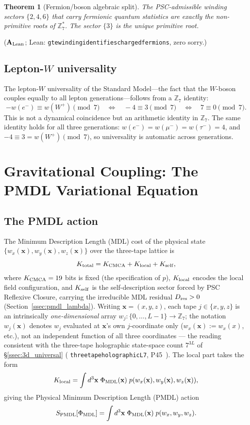 \documentclass[11pt]{article}
\newtheorem{theorem}{Theorem}[section]
\theoremstyle{remark}
\newcommand{\PHIMDL}{\Phi_{\mathrm{MDL}}}
\newcommand{\ZS}{\mathbb{Z}_7}
\newcommand{\ZSstar}{\mathbb{Z}_7^*}
\newcommand{\lean}[1]{%
  \penalty-100
  \begingroup\def\_{\textunderscore\allowbreak}\texttt{#1}\endgroup}
\newcommand{\CatAL}{\ensuremath{\textbf{A}_{\rm Lean}}}
\begin{document}
\begin{theorem}[Fermion/boson algebraic split]
The PSC-admissible winding sectors $\{2,4,6\}$ that carry fermionic quantum
statistics are exactly the non-primitive roots of $\ZSstar$.
The sector $\{3\}$ is the unique primitive root.
\end{theorem}

($\CatAL$; Lean: \lean{gte\_winding\_identifies\_charged\_fermions}, zero sorry.)

\subsection{Lepton-$W$ universality}
\label{ssec:lw_univ}

The lepton-$W$ universality of the Standard Model---the fact that the
$W$-boson couples equally to all lepton generations---follows from a $\ZS$
identity:
\[
  -w(e^-) \equiv w(W^+) \pmod 7 \quad \Leftrightarrow \quad
  -4 \equiv 3 \pmod 7 \quad \Leftrightarrow \quad 7 \equiv 0 \pmod 7.
\]
This is not a dynamical coincidence but an arithmetic identity in $\ZS$.
The same identity holds for all three generations: $w(e^-)=w(\mu^-)=w(\tau^-)=4$,
and $-4\equiv 3=w(W^+)\pmod7$, so universality is automatic across generations.

\section{Gravitational Coupling: The PMDL Variational Equation}
\label{sec:gravity}

\subsection{The PMDL action}
\label{ssec:pmdl_action}

The Minimum Description Length (MDL) cost of the physical state
$\{w_x(\mathbf{x}),w_y(\mathbf{x}),w_z(\mathbf{x})\}$ over the three-tape lattice is
\[
  K_{\rm total} = K_{\rm CMCA} + K_{\rm local} + K_{\rm self},
\]
where $K_{\rm CMCA} = 19$ bits is fixed (the specification of $p$),
$K_{\rm local}$ encodes the local field configuration, and $K_{\rm self}$ is the
self-description sector forced by PSC Reflexive Closure, carrying the irreducible
MDL residual $D_{\rm res} > 0$ (Section~\ref{ssec:pmdl_lambda}). Writing
$\mathbf{x}=(x,y,z)$, each tape $j\in\{x,y,z\}$ is an intrinsically
\emph{one-dimensional} array $w_j:\{0,\ldots,L-1\}\to\mathbb{Z}_7$; the notation
$w_j(\mathbf{x})$ denotes $w_j$ evaluated at $\mathbf{x}$'s own $j$-coordinate
only ($w_x(\mathbf{x}):=w_x(x)$, etc.), not an independent function of all three
coordinates --- the reading consistent with the three-tape holographic
state-space count $7^{3L}$ of \S\ref{ssec:3d_universal}
(\lean{three\_tape\_holographic\_L7}, P45~\cite{SpivackThreeTapeCMCA}). The local
part takes the form
\[
  K_{\rm local} = \int d^3\mathbf{x}\; \PHIMDL(\mathbf{x})\; p(w_x(\mathbf{x}),
  w_y(\mathbf{x}), w_z(\mathbf{x})),
\]
giving the Physical Minimum Description Length (PMDL) action
\[
  S_{\rm PMDL}[\PHIMDL] = \int d^3\mathbf{x}\;
  \PHIMDL(\mathbf{x})\; p(w_x, w_y, w_z).
\]
\end{document}
